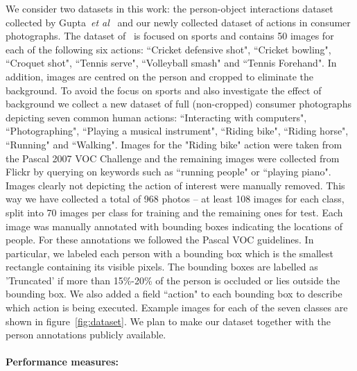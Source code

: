 \documentclass{bmvc2k}
\def\etal{\emph{et al}\bmvaOneDot}
\newcommand{\red}[1]{{\em \small \color{red} #1}} %
\newcommand{\green}[1]{#1} %
\newcommand{\parnspc}{\vspace*{-4.2mm}}
\begin{document}
We consider two datasets in this work: the person-object interactions dataset collected by Gupta~\etal~\cite{Gupta09} and our newly collected dataset of actions in consumer photographs. 
The dataset of~\cite{Gupta09} is focused on sports and contains 50 images for each of the following six actions: ``Cricket defensive shot", ``Cricket bowling", ``Croquet shot", ``Tennis serve", ``Volleyball smash" and ``Tennis Forehand".   In addition, images are centred  on the person and cropped to eliminate the background.  
To avoid the focus on sports and also investigate the effect of background we collect a new dataset of full (non-cropped) consumer photographs depicting seven common human actions: ``Interacting with computers", ``Photographing", ``Playing a musical instrument", ``Riding bike", ``Riding horse", ``Running" and ``Walking".  Images for the \green{"Riding bike"} action were taken from the Pascal 2007 VOC Challenge and the remaining images were collected from Flickr by querying on keywords such as \green{``running people" or ``playing piano"}.  Images clearly not depicting the action of interest were manually removed. This way we have collected a total of  968 photos -- \green{at least 108} images for each class, split into \green{70 images per class} for training and \green{the remaining ones} for test. Each image was manually annotated with bounding boxes indicating the locations of people. %
For these annotations we followed the Pascal VOC guidelines. \green{In particular, we labeled each person with a bounding box which is the smallest rectangle containing its visible pixels. The bounding boxes are labelled as 'Truncated' if more than 15\%-20\% of the person is occluded or lies outside the bounding box. We also added a field  ``action" to each bounding box to describe which action is being executed.}%
Example images for each of the seven classes are shown in figure~\ref{fig:dataset}.
We plan to make our dataset together with the person annotations publicly available. %

\parnspc
\paragraph{Performance measures:}
\end{document}

